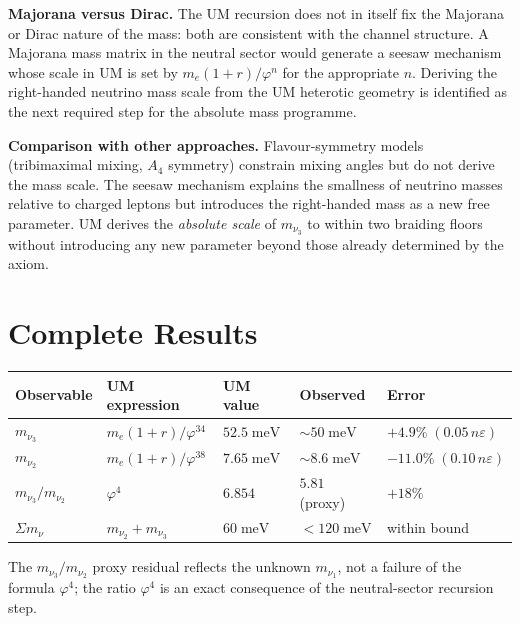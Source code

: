 \documentclass[12pt]{article}
\begin{document}
\textbf{Majorana versus Dirac.}
The UM recursion does not in itself fix the Majorana or Dirac
nature of the mass: both are consistent with the channel structure.
A Majorana mass matrix in the neutral sector would generate a seesaw
mechanism whose scale in UM is set by $m_e(1+r)/\varphi^n$ for
the appropriate $n$.  Deriving the right-handed neutrino mass scale
from the UM heterotic geometry is identified as the next required
step for the absolute mass programme.

\textbf{Comparison with other approaches.}
Flavour-symmetry models (tribimaximal mixing, $A_4$ symmetry)
constrain mixing angles but do not derive the mass scale.
The seesaw mechanism explains the smallness of neutrino masses
relative to charged leptons but introduces the right-handed mass
as a new free parameter.  UM derives the \emph{absolute scale}
of $m_{\nu_3}$ to within two braiding floors without introducing
any new parameter beyond those already determined by the axiom.

\section{Complete Results}

\begin{center}
\begin{tabular}{lllll}
\toprule
Observable & UM expression & UM value & Observed & Error \\
\midrule
$m_{\nu_3}$
  & $m_e(1{+}r)/\varphi^{34}$
  & $52.5\;\text{meV}$
  & ${\sim}50\;\text{meV}$
  & $+4.9\%\;(0.05\,n\varepsilon)$ \\
$m_{\nu_2}$
  & $m_e(1{+}r)/\varphi^{38}$
  & $7.65\;\text{meV}$
  & ${\sim}8.6\;\text{meV}$
  & $-11.0\%\;(0.10\,n\varepsilon)$ \\
$m_{\nu_3}/m_{\nu_2}$
  & $\varphi^4$
  & $6.854$
  & $5.81$ (proxy)
  & $+18\%$ \\
$\Sigma m_\nu$
  & $m_{\nu_2} + m_{\nu_3}$
  & $60\;\text{meV}$
  & ${<}120\;\text{meV}$
  & within bound \\
\bottomrule
\end{tabular}
\end{center}

The $m_{\nu_3}/m_{\nu_2}$ proxy residual reflects the unknown
$m_{\nu_1}$, not a failure of the formula $\varphi^4$; the ratio
$\varphi^4$ is an exact consequence of the neutral-sector recursion
step.
\end{document}
